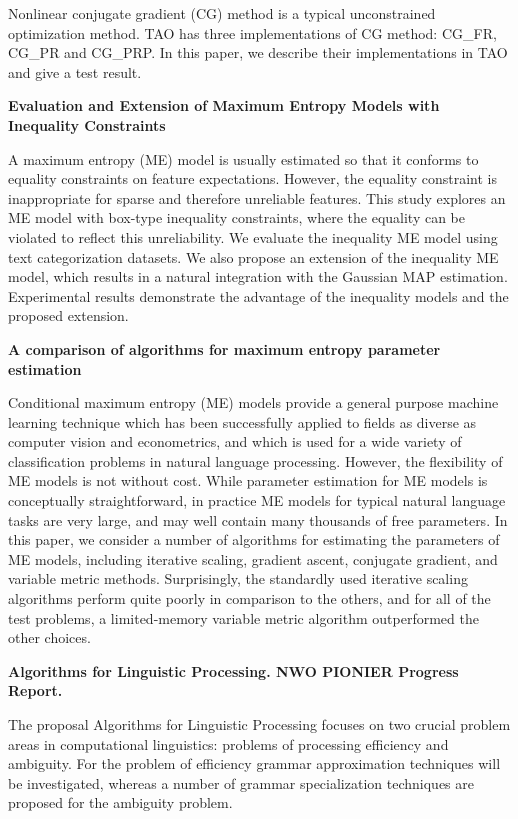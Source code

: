 \documentclass[11pt]{article}
\begin{document}
\noindent
Nonlinear conjugate gradient (CG) method is a typical unconstrained
optimization method. TAO has three implementations of CG method:
CG\_FR, CG\_PR and CG\_PRP. In this paper, we describe their
implementations in TAO and give a test result.


\bigskip
\noindent
\textbf{Evaluation and Extension of Maximum Entropy Models with
  Inequality Constraints} 
\cite{kazama03evaluation}

\noindent
A maximum entropy (ME) model is usually estimated so that it conforms
to equality constraints on feature expectations. However, the
equality constraint is inappropriate for sparse and therefore
unreliable features. This study explores an ME model with box-type
inequality constraints, where the equality can be violated to
reflect this unreliability. We evaluate the inequality ME model
using text categorization datasets. We also propose an extension of
the inequality ME model, which results in a natural integration with
the Gaussian MAP estimation. Experimental results demonstrate the
advantage of the inequality models and the proposed extension.


\bigskip
\noindent
\textbf{A comparison of algorithms for maximum entropy parameter
  estimation}
\cite{malouf02comparison}

\noindent
Conditional maximum entropy (ME) models provide a general purpose
machine learning technique which has been successfully applied to
fields as diverse as computer vision and econometrics, and which is
used for a wide variety of classification problems in natural language
processing. However, the flexibility of ME models is not without
cost. While parameter estimation for ME models is conceptually
straightforward, in practice ME models for typical natural language
tasks are very large, and may well contain many thousands of free
parameters. In this paper, we consider a number of algorithms for
estimating the parameters of ME models, including iterative scaling,
gradient ascent, conjugate gradient, and variable metric
methods. Surprisingly, the standardly used iterative scaling
algorithms perform quite poorly in comparison to the others, and for
all of the test problems, a limited-memory variable metric algorithm
outperformed the other choices.


\bigskip
\noindent
\textbf{Algorithms for Linguistic Processing. NWO PIONIER Progress
  Report.}
\cite{Noord02algorithms}

\noindent
The proposal Algorithms for Linguistic Processing focuses on two
crucial problem areas in computational linguistics: problems of
processing efficiency and ambiguity. For the problem of efficiency
grammar approximation techniques will be investigated, whereas a
number of grammar specialization techniques are proposed for the
ambiguity problem.
\end{document}
